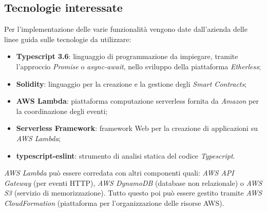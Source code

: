     \subsection{Tecnologie interessate}
        Per l'implementazione delle varie funzionalità vengono date dall'azienda delle linee guida sulle tecnologie da utilizzare:
        \begin{itemize}
            \item \textbf{Typescript 3.6}: linguaggio di programmazione da impiegare, tramite l'approccio \textit{Promise} o \textit{async-await}, nello sviluppo della piattaforma \textit{Etherless};
            \item \textbf{Solidity}: linguaggio per la creazione e la gestione degli \textit{Smart Contracts};
            \item \textbf{AWS Lambda}: piattaforma computazione serverless fornita da \textit{Amazon} per la coordinazione degli eventi;
            \item \textbf{Serverless Framework}: framework Web per la creazione di applicazioni su \textit{AWS Lambda};
            \item \textbf{typescript-eslint}: strumento di analisi statica del codice \textit{Typescript}.
        \end{itemize}
        \textit{AWS Lambda} può essere corredata con altri componenti quali: \textit{AWS API Gateway} (per eventi HTTP), \textit{AWS DynamoDB} (database non relazionale)
        o \textit{AWS S3} (servizio di memorizzazione). Tutto questo poi può essere gestito tramite \textit{AWS CloudFormation} (piattaforma per l'organizzazione delle
        risorse AWS).
